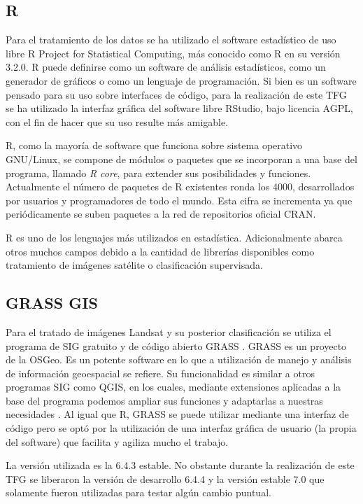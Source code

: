 \subsection{R}
Para el tratamiento de los datos se ha utilizado el software estadístico de uso libre R Project for Statistical Computing, más conocido como R \citep{R2013} en su versión 3.2.0. R puede definirse como un software de análisis estadísticos, como un generador de gráficos o como un lenguaje de programación. Si bien es un software pensado para su uso sobre interfaces de código, para la realización de este \ac{TFG} se ha utilizado la interfaz gráfica del software libre RStudio, bajo licencia AGPL, con el fin de hacer que su uso resulte más amigable.\Sep

R, como la mayoría de software que funciona sobre sistema operativo GNU/Linux, se compone de módulos o paquetes que se incorporan a una base del programa, llamado \textit{R core}, para extender sus posibilidades y funciones. Actualmente el número de paquetes de R existentes ronda los 4000, desarrollados por usuarios y programadores de todo el mundo. Esta cifra se incrementa ya que periódicamente se suben paquetes a la red de repositorios oficial \ac{CRAN}.\Sep

R es uno de los lenguajes más utilizados en estadística. Adicionalmente abarca otros muchos campos debido a la cantidad de librerías disponibles como tratamiento de imágenes satélite o clasificación supervisada.

\subsection{GRASS GIS}
Para el tratado de imágenes Landsat y su posterior clasificación se utiliza el programa de \ac{SIG} gratuito y de código abierto \ac{GRASS} \citep{GRASS_GIS_software}. GRASS es un proyecto de la \ac{OSGeo}. Es un potente software en lo que a utilización de manejo y análisis de información geoespacial se refiere. Su funcionalidad es similar a otros programas \ac{SIG} como QGIS, en los cuales, mediante extensiones aplicadas a la base del programa podemos ampliar sus funciones y adaptarlas a nuestras necesidades \citep{neteler2002open}. Al igual que R, \ac{GRASS} se puede utilizar mediante una interfaz de código pero se optó por la utilización de una interfaz gráfica de usuario (la propia del software) que facilita y agiliza mucho el trabajo.\Sep

La versión utilizada es la 6.4.3 estable. No obstante durante la realización de este \ac{TFG} se liberaron la versión de desarrollo 6.4.4 y la versión estable 7.0 que solamente fueron utilizadas para testar algún cambio puntual.

